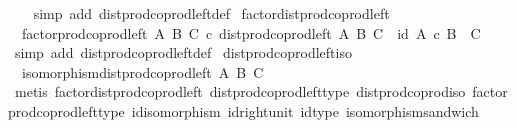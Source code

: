 \begin{isabellebody}
%
\isadelimproof
\ \ %
\endisadelimproof
%
\isatagproof
{}\isamarkupfalse%
\ {\isacharparenleft}{\kern0pt}simp\ add{\isacharcolon}{\kern0pt}\ dist{\isacharunderscore}{\kern0pt}prod{\isacharunderscore}{\kern0pt}coprod{\isacharunderscore}{\kern0pt}left{\isacharunderscore}{\kern0pt}def{}{\isacharparenright}{\kern0pt}%
\endisatagproof
{\isafoldproof}%
%
\isadelimproof
\isanewline
%
\endisadelimproof
\isanewline
{}\isamarkupfalse%
\ factor{\isacharunderscore}{\kern0pt}dist{\isacharunderscore}{\kern0pt}prod{\isacharunderscore}{\kern0pt}coprod{\isacharunderscore}{\kern0pt}left{\isacharcolon}{\kern0pt}\isanewline
\ \ {\isachardoublequoteopen}factor{\isacharunderscore}{\kern0pt}prod{\isacharunderscore}{\kern0pt}coprod{\isacharunderscore}{\kern0pt}left\ A\ B\ C\ {\isasymcirc}\isactrlsub c\ dist{\isacharunderscore}{\kern0pt}prod{\isacharunderscore}{\kern0pt}coprod{\isacharunderscore}{\kern0pt}left\ A\ B\ C\ {\isacharequal}{\kern0pt}\ id\ {\isacharparenleft}{\kern0pt}A\ {\isasymtimes}\isactrlsub c\ {\isacharparenleft}{\kern0pt}B\ {\isasymCoprod}\ C{\isacharparenright}{\kern0pt}{\isacharparenright}{\kern0pt}{\isachardoublequoteclose}\isanewline
%
\isadelimproof
\ \ %
\endisadelimproof
%
\isatagproof
{}\isamarkupfalse%
\ {\isacharparenleft}{\kern0pt}simp\ add{\isacharcolon}{\kern0pt}\ dist{\isacharunderscore}{\kern0pt}prod{\isacharunderscore}{\kern0pt}coprod{\isacharunderscore}{\kern0pt}left{\isacharunderscore}{\kern0pt}def{}{\isacharparenright}{\kern0pt}%
\endisatagproof
{\isafoldproof}%
%
\isadelimproof
\isanewline
%
\endisadelimproof
\isanewline
{}\isamarkupfalse%
\ dist{\isacharunderscore}{\kern0pt}prod{\isacharunderscore}{\kern0pt}coprod{\isacharunderscore}{\kern0pt}left{\isacharunderscore}{\kern0pt}iso{\isacharcolon}{\kern0pt}\isanewline
\ \ {\isachardoublequoteopen}isomorphism{\isacharparenleft}{\kern0pt}dist{\isacharunderscore}{\kern0pt}prod{\isacharunderscore}{\kern0pt}coprod{\isacharunderscore}{\kern0pt}left\ A\ B\ C{\isacharparenright}{\kern0pt}{\isachardoublequoteclose}\isanewline
%
\isadelimproof
\ \ %
\endisadelimproof
%
\isatagproof
{}\isamarkupfalse%
\ {\isacharparenleft}{\kern0pt}metis\ factor{\isacharunderscore}{\kern0pt}dist{\isacharunderscore}{\kern0pt}prod{\isacharunderscore}{\kern0pt}coprod{\isacharunderscore}{\kern0pt}left\ dist{\isacharunderscore}{\kern0pt}prod{\isacharunderscore}{\kern0pt}coprod{\isacharunderscore}{\kern0pt}left{\isacharunderscore}{\kern0pt}type\ dist{\isacharunderscore}{\kern0pt}prod{\isacharunderscore}{\kern0pt}coprod{\isacharunderscore}{\kern0pt}iso\ factor{\isacharunderscore}{\kern0pt}prod{\isacharunderscore}{\kern0pt}coprod{\isacharunderscore}{\kern0pt}left{\isacharunderscore}{\kern0pt}type\ id{\isacharunderscore}{\kern0pt}isomorphism\ id{\isacharunderscore}{\kern0pt}right{\isacharunderscore}{\kern0pt}unit{}\ id{\isacharunderscore}{\kern0pt}type\ isomorphism{\isacharunderscore}{\kern0pt}sandwich{\isacharparenright}{\kern0pt}%

\end{isabellebody}
